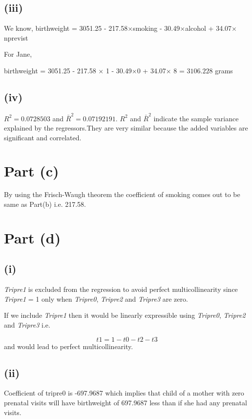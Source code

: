 \documentclass{./solution}
\begin{document}
\begin{solution}
            \subsection*{(iii)}
            We know,
            birthweight = 3051.25 - 217.58$\times$smoking - 30.49$\times$alcohol  + 34.07$\times$nprevist
            
            For Jane,
            
            birthweight = 3051.25 - 217.58 $\times$ 1 - 30.49$\times$0  + 34.07$\times$ 8 = $3106.228 $ grams
            
            \subsection*{(iv)}
            $R^{2} = 0.0728503$ and $\bar{R}^{2}=0.07192191$.
            $R^{2}$ and $\bar{R}^{2}$  indicate the sample variance explained 
            by the regressors.They are very similar because the added variables
            are significant and correlated.
            
        \section*{Part (c)}
            By using the Frisch-Waugh theorem the coefficient of smoking comes out to be same as Part(b) i.e. 217.58.
            
        \section*{Part (d)}
            \subsection*{(i)}
            \textit{Tripre1} is excluded from the regression to avoid perfect 
            multicollinearity since \textit{Tripre1} = 1 only when  \textit{Tripre0},  \textit{Tripre2} and  \textit{Tripre3} are zero.
            
            If we include \textit{Tripre1} then it would be linearly expressible
            using \textit{Tripre0},  \textit{Tripre2} and  \textit{Tripre3} i.e.
            
            \[ t1 = 1 - t0 -t2 -t3 \] and would lead to perfect multicollinearity.
            
            \subsection*{(ii)}
            Coefficient of tripre0 is -697.9687 which implies that child of a mother 
            with zero prenatal visits will have birthweight of 697.9687 less than if she had any prenatal visits.
            

\end{solution}
\end{document}
